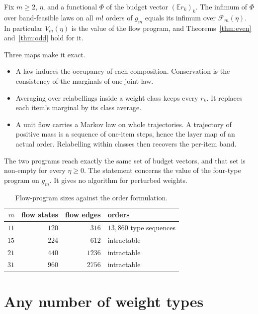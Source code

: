 \begin{theorem}
\label{thm:flow}
Fix $m\ge2$, $\eta$, and a functional $\Phi$ of the budget vector $(\mathbb{E}r_{k})_{k}$. The
infimum of $\Phi$ over band-feasible laws on all $m!$ orders of $g_{m}$ equals its infimum
over $\mathcal{F}_{m}(\eta)$. In particular $V_{m}(\eta)$ is the value of the flow program,
and Theorems~\ref{thm:even} and~\ref{thm:odd} hold for it.
\end{theorem}


Three maps make it exact.
\begin{itemize}
\item A law induces the occupancy of each composition. Conservation is the consistency of the
marginals of one joint law.
\item Averaging over relabellings inside a weight class keeps every $r_{k}$. It replaces each
item's marginal by its class average.
\item A unit flow carries a Markov law on whole trajectories. A trajectory of positive mass is
a sequence of one-item steps, hence the layer map of an actual order. Relabelling within
classes then recovers the per-item band.
\end{itemize}
The two programs reach exactly the same set of budget vectors, and that set is non-empty for
every $\eta\ge0$. The statement concerns the value of the four-type program on $g_{m}$. It
gives no algorithm for perturbed weights.

\begin{table}[t]
\caption{Flow-program sizes against the order formulation. \NUM{}}
\label{tab:agree}
\centering
\footnotesize
\begin{tabular}{@{}rrrl@{}}
\toprule
$m$ & flow states & flow edges & orders \\
\midrule
$11$ & $120$ & $316$ & $13{,}860$ type sequences \\
$15$ & $224$ & $612$ & intractable \\
$21$ & $440$ & $1236$ & intractable \\
$31$ & $960$ & $2756$ & intractable \\
\bottomrule
\end{tabular}
\end{table}

\section{Any number of weight types}
\label{sec:typed}

